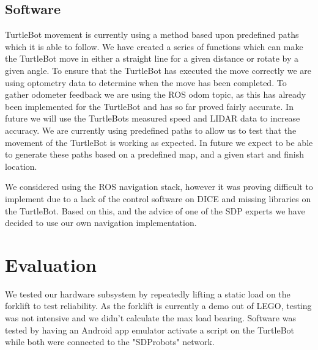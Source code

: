 \documentclass{article}
\begin{document}
\subsection{Software}



TurtleBot movement is currently using a method based upon predefined paths which it is able to follow.
We have created a series of functions which can make the TurtleBot move in either a straight line for a given distance or rotate by a given angle.
To ensure that the TurtleBot has executed the move correctly we are using optometry data to determine when the move has been completed. 
To gather odometer feedback we are using the ROS odom topic, as this has already been implemented for the TurtleBot and has so far proved fairly accurate.
In future we will use the TurtleBots measured speed and LIDAR data to increase accuracy.
We are currently using predefined paths to allow us to test that the movement of the TurtleBot is working as expected. In future we expect to be able to generate these paths based on a predefined map, and a given start and finish location.

We considered using the ROS navigation stack, however it was proving difficult to implement due to a lack of the control software on DICE and missing libraries on the TurtleBot. 
Based on this, and the advice of one of the SDP experts we have decided to use our own navigation implementation.

\section{Evaluation}

We tested our hardware subsystem by repeatedly lifting a static load on the forklift to test reliability. As the forklift is currently a demo out of LEGO, testing was not intensive and we didn't calculate the max load bearing.
Software was tested by having an Android app emulator activate a script on the TurtleBot while both were connected to the "SDProbots" network.
\end{document}

